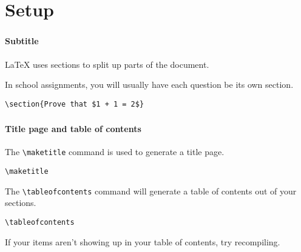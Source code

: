 \documentclass{beamer}
\begin{document}
	\section{Setup}
	\begin{frame}[fragile]
		\frametitle{\secname}
		\framesubtitle{Subtitle}
		\LaTeX{} uses \alert{sections} to split up parts of the document.

		In school assignments, you will usually have each question be its own section.
		\begin{example}
			\begin{lstlisting}[numbers=none, gobble=16]
				\section{Prove that $1 + 1 = 2$}
			\end{lstlisting}
		\end{example}
	\end{frame}
	\begin{frame}[fragile]
		\frametitle{\secname}
		\framesubtitle{Title page and table of contents}
		The \lstinline{\maketitle} command is used to generate a title page.
		\begin{example}
			\begin{lstlisting}[numbers=none, gobble=16]
				\maketitle
			\end{lstlisting}
		\end{example}
		
		The \lstinline{\tableofcontents} command will generate a table of contents out of your sections.
		\begin{example}
			\begin{lstlisting}[numbers=none, gobble=16]
				\tableofcontents
			\end{lstlisting}
		\end{example}
		If your items aren't showing up in your table of contents, try recompiling.
	\end{frame}
\end{document}
